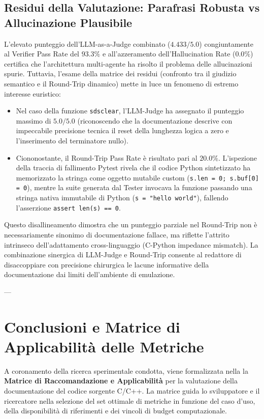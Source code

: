 \subsection{Residui della Valutazione: Parafrasi Robusta vs Allucinazione Plausibile}
L'elevato punteggio dell'LLM-as-a-Judge combinato ($\mathbf{4.433} / 5.0$) congiuntamente al Verifier Pass Rate del $\mathbf{93.3\%}$ e all'azzeramento dell'Hallucination Rate ($\mathbf{0.0\%}$) certifica che l'architettura multi-agente ha risolto il problema delle allucinazioni spurie.
Tuttavia, l'esame della matrice dei residui (confronto tra il giudizio semantico e il Round-Trip dinamico) mette in luce un fenomeno di estremo interesse euristico:
\begin{itemize}
    \item Nel caso della funzione \texttt{sdsclear}, l'LLM-Judge ha assegnato il punteggio massimo di $\mathbf{5.0 / 5.0}$ (riconoscendo che la documentazione descrive con impeccabile precisione tecnica il reset della lunghezza logica a zero e l'inserimento del terminatore nullo).
    \item Ciononostante, il Round-Trip Pass Rate è risultato pari al $\mathbf{20.0\%}$. L'ispezione della traccia di fallimento Pytest rivela che il codice Python sintetizzato ha memorizzato la stringa come oggetto mutabile custom (\texttt{s.len = 0; s.buf[0] = 0}), mentre la suite generata dal Tester invocava la funzione passando una stringa nativa immutabile di Python (\texttt{s = "hello world"}), fallendo l'asserzione \texttt{assert len(s) == 0}.
\end{itemize}
Questo disallineamento dimostra che un punteggio parziale nel Round-Trip non è necessariamente sinonimo di documentazione fallace, ma riflette l'attrito intrinseco dell'adattamento cross-linguaggio (C-Python impedance mismatch). La combinazione sinergica di LLM-Judge e Round-Trip consente al redattore di disaccoppiare con precisione chirurgica le lacune informative della documentazione dai limiti dell'ambiente di emulazione.

---

\section{Conclusioni e Matrice di Applicabilità delle Metriche}
\label{sec:matrice_applicabilita}

A coronamento della ricerca sperimentale condotta, viene formalizzata nella  la \textbf{Matrice di Raccomandazione e Applicabilità} per la valutazione della documentazione del codice sorgente C/C++. La matrice guida lo sviluppatore e il ricercatore nella selezione del set ottimale di metriche in funzione del caso d'uso, della disponibilità di riferimenti e dei vincoli di budget computazionale.

